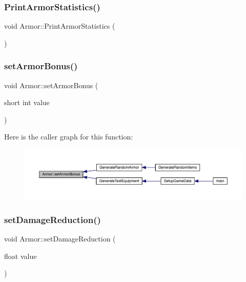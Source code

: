 \mbox{\label{class_armor_a248a63d0d2801a10d6a4039f60b6a0c7}} 
\subsubsection{\texorpdfstring{Print\+Armor\+Statistics()}{PrintArmorStatistics()}}
{\footnotesize\ttfamily void Armor\+::\+Print\+Armor\+Statistics (\begin{DoxyParamCaption}{ }\end{DoxyParamCaption})}

\mbox{\label{class_armor_a14c15f72741f2a3dec28c746b3678c20}} 
\subsubsection{\texorpdfstring{set\+Armor\+Bonus()}{setArmorBonus()}}
{\footnotesize\ttfamily void Armor\+::set\+Armor\+Bonus (\begin{DoxyParamCaption}\item[{short int}]{value }\end{DoxyParamCaption})}

Here is the caller graph for this function\+:
\nopagebreak
\begin{figure}[H]
\begin{center}
\leavevmode
\includegraphics[width=350pt]{d9/d76/class_armor_a14c15f72741f2a3dec28c746b3678c20_icgraph}
\end{center}
\end{figure}
\mbox{\label{class_armor_a08f926ae8438bae04058c22b098c6fcf}} 
\subsubsection{\texorpdfstring{set\+Damage\+Reduction()}{setDamageReduction()}}
{\footnotesize\ttfamily void Armor\+::set\+Damage\+Reduction (\begin{DoxyParamCaption}\item[{float}]{value }\end{DoxyParamCaption})}

